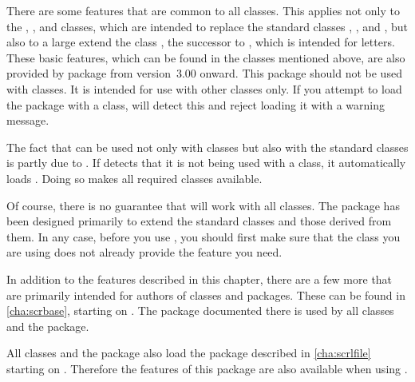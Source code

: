 There are some features that are common to all \KOMAScript{} classes. This
applies not only to the , , and
 classes, which are intended to replace the standard classes
, , and , but also to a large extend
the \KOMAScript{} class , the successor to ,
which is intended for letters. These basic features, which can be found in the
classes mentioned above, are also provided by package  from
\KOMAScript{} version~3.00 onward. This package should
not be used with \KOMAScript{} classes. It is intended for use with other
classes only. If you attempt to load the package with a \KOMAScript{} class,
 will detect this and reject loading it with a warning
message.

The fact that \hyperref[cha:scrlttr2]{}%
 can be used not only with \KOMAScript{} classes but
also with the standard classes is partly due to . If
\hyperref[cha:scrlttr2]{} detects that it is not being used
with a \KOMAScript class, it automatically loads . Doing
so makes all required \KOMAScript{} classes available.

Of course, there is no guarantee that  will work with all
classes. The package has been designed primarily to extend the standard
classes and those derived from them. In any case, before you use
, you should first make sure that the class you are using
does not already provide the feature you need.

In addition to the features described in this chapter, there are a few more
that are primarily intended for authors of classes and packages. These can be
found in \autoref{cha:scrbase}, starting on . The 
\hyperref[cha:scrbase]{}%
package documented there is used by all \KOMAScript{} classes and the
 package.

All \KOMAScript{} classes and the  package also load the
\hyperref[cha:scrlfile]{}%
package described in \autoref{cha:scrlfile} starting on
. Therefore the features of this package are also
available when using .

